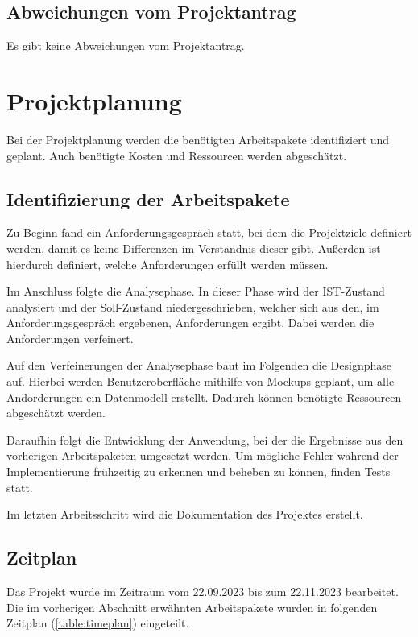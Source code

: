 \documentclass[11pt]{article}
\begin{document}
\subsection{Abweichungen vom Projektantrag}
Es gibt keine Abweichungen vom Projektantrag.


%
%

\section{Projektplanung}
Bei der Projektplanung werden die benötigten Arbeitspakete identifiziert und geplant.
Auch benötigte Kosten und Ressourcen werden abgeschätzt.

\subsection{Identifizierung der Arbeitspakete}
Zu Beginn fand ein Anforderungsgespräch statt, bei dem die Projektziele 
definiert werden, damit es keine Differenzen im Verständnis dieser gibt. Außerden ist hierdurch
definiert, welche Anforderungen erfüllt werden müssen. 

Im Anschluss folgte die Analysephase. In dieser Phase wird der IST-Zustand analysiert und 
der Soll-Zustand niedergeschrieben, welcher sich aus den, im Anforderungsgespräch ergebenen, Anforderungen ergibt.
Dabei werden die Anforderungen verfeinert.

Auf den Verfeinerungen der Analysephase baut im Folgenden die Designphase auf.
Hierbei werden Benutzeroberfläche mithilfe von Mockups geplant, um alle Andorderungen  
ein Datenmodell erstellt. Dadurch können benötigte Ressourcen abgeschätzt werden.

Daraufhin folgt die Entwicklung der Anwendung, bei der die Ergebnisse aus den 
vorherigen Arbeitspaketen umgesetzt werden. Um mögliche Fehler während der 
Implementierung frühzeitig zu erkennen und beheben zu können, finden Tests statt. 

Im letzten Arbeitsschritt wird die Dokumentation des Projektes erstellt. 

\subsection{Zeitplan}
Das Projekt wurde im Zeitraum vom 22.09.2023 bis zum 22.11.2023 bearbeitet. 
Die im vorherigen Abschnitt erwähnten Arbeitspakete wurden in folgenden Zeitplan 
(\autoref{table:timeplan}) eingeteilt. 
\end{document}
